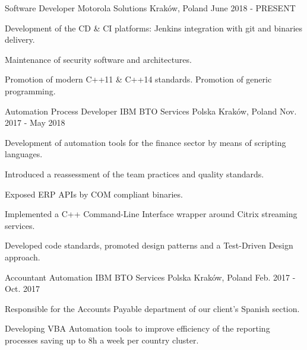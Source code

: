 

\begin{cventries}

\cventry
    {Software Developer} %
    {Motorola Solutions} %
    {Kraków, Poland} %
    {June 2018 - PRESENT} %
    {
        \begin{cvitems} %
            \item {Development of the CD \& CI platforms: Jenkins integration with git and binaries delivery.}
            \item {Maintenance of security software and architectures.}
            \item {Promotion of modern C++11 \& C++14 standards. Promotion of generic programming.}
        \end{cvitems}
    }

\cventry
    {Automation Process Developer} %
    {IBM BTO Services Polska} %
    {Kraków, Poland} %
    {Nov. 2017 - May 2018} %
    {
        \begin{cvitems} %
            \item {Development of automation tools for the finance sector by means of scripting languages.}
            \item {Introduced a reassessment of the team practices and quality standards.}
            \item {Exposed ERP APIs by COM compliant binaries.}
            \item {Implemented a C++ Command-Line Interface wrapper around Citrix streaming services.}
            \item {Developed code standards, promoted design patterns and a Test-Driven Design approach.}
        \end{cvitems}
    }

\cventry
    {Accountant Automation} %
    {IBM BTO Services Polska} %
    {Kraków, Poland} %
    {Feb. 2017 - Oct. 2017} %
    {
        \begin{cvitems} %
            \item {Responsible for the Accounts Payable department of our client's Spanish section.}
            \item {Developing VBA Automation tools to improve efficiency of the reporting processes saving up to 8h a week per country cluster.}
        \end{cvitems}
    }


\end{cventries}

